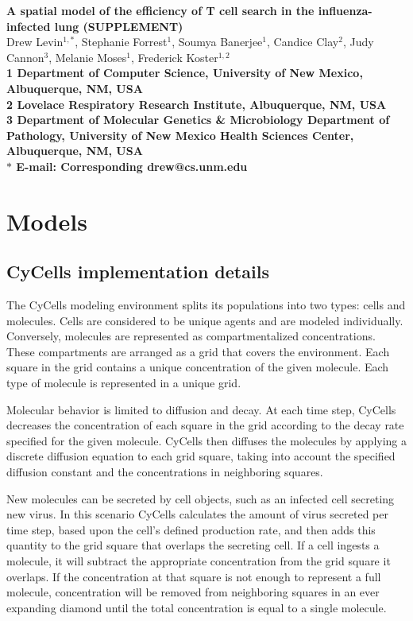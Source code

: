 \documentclass[preprint,10pt,authoryear]{elsarticle}
\date{}
\begin{document}
\begin{flushleft}
{\Large
\textbf{A spatial model of the efficiency of T cell search in the influenza-infected lung (SUPPLEMENT)}
}
\\
Drew Levin$^{1,\ast}$, 
Stephanie Forrest$^{1}$, 
Soumya Banerjee$^{1}$,
Candice Clay$^{2}$, 
Judy Cannon$^{3}$,
Melanie Moses$^{1}$, 
Frederick Koster$^{1,2}$
\\
\bf{1} Department of Computer Science, University of New Mexico, Albuquerque, NM, USA
\\
\bf{2} Lovelace Respiratory Research Institute, Albuquerque, NM, USA
\\
\bf{3} Department of Molecular Genetics \& Microbiology Department of Pathology, University of New Mexico Health Sciences Center, Albuquerque, NM, USA
\\
$\ast$ E-mail: Corresponding drew@cs.unm.edu
\end{flushleft}


\section{Models}

\subsection{CyCells implementation details}

The CyCells modeling environment splits its populations into two types: cells and molecules.  Cells are considered to be unique agents and are modeled individually.  Conversely, molecules are represented as compartmentalized concentrations.  These compartments are arranged as a grid that covers the environment.  Each square in the grid contains a unique concentration of the given molecule.  Each type of  molecule is represented in a unique grid.

Molecular behavior is limited to diffusion and decay.  At each time step, CyCells decreases the concentration of each square in the grid according to the decay rate specified for the given molecule.  CyCells then diffuses the molecules by applying a discrete diffusion equation to each grid square, taking into account the specified diffusion constant and the concentrations in neighboring squares.

New molecules can be secreted by cell objects, such as an infected cell secreting new virus.  In this scenario CyCells calculates the amount of virus secreted per time step, based upon the cell's defined production rate, and then adds this quantity to the grid square that overlaps the secreting cell.  If a cell ingests a molecule, it will subtract the appropriate concentration from the grid square it overlaps.  If the concentration at that square is not enough to represent a full molecule, concentration will be removed from neighboring squares in an ever expanding diamond until the total concentration is equal to a single molecule.
\end{document}
